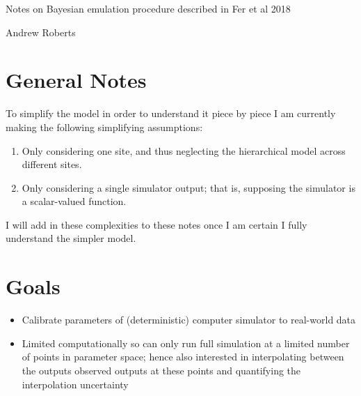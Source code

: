 \documentclass[12pt]{article}
\begin{document}
\begin{center}
\Large
Notes on Bayesian emulation procedure described in Fer et al 2018
\end{center}

\begin{flushright}
Andrew Roberts
\end{flushright} 

\section{General Notes}
To simplify the model in order to understand it piece by piece I am currently making the following simplifying assumptions: 
\begin{enumerate}
\item Only considering one site, and thus neglecting the hierarchical model across different sites. 
\item Only considering a single simulator output; that is, supposing the simulator is a scalar-valued function. 
\end{enumerate}
I will add in these complexities to these notes once I am certain I fully understand the simpler model. 

\section{Goals}
\begin{itemize}
\item Calibrate parameters of (deterministic) computer simulator to real-world data
\item Limited computationally so can only run full simulation at a limited number of points in parameter space; hence also interested in interpolating between the 
outputs observed outputs at these points and quantifying the interpolation uncertainty
\end{itemize}

\end{document}

